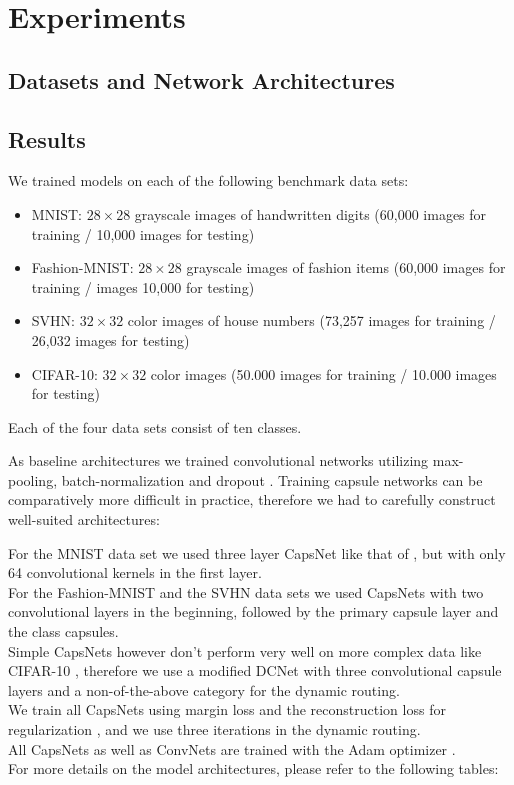 
\section{Experiments}

\subsection{Datasets and Network Architectures}



\subsection{Results}
 
 We trained models on each of the following benchmark data sets:

\begin{itemize}
	\item MNIST: $28\times28$ grayscale images of handwritten digits (60,000  images for training / 10,000  images for testing) \cite{mnist}
	\item Fashion-MNIST:  $28\times28$ grayscale images of fashion items (60,000 images for training / images 10,000 for testing) \cite{fashion}
	\item SVHN: $32\times32$ color images of house numbers (73,257  images for training / 26,032 images for testing) \cite{svhn}
	\item CIFAR-10: $32\times32$ color images (50.000  images for training / 10.000  images for testing) \cite{cifar}
\end{itemize}

Each of the four data sets consist of ten classes.

As baseline architectures we trained convolutional networks utilizing max-pooling,
batch-normalization \citep{batchnorm} and dropout \citep{dropout}.
Training capsule networks can be comparatively more difficult in practice, therefore we had to carefully construct well-suited architectures:

For the MNIST data set we used three layer CapsNet like that of \citet{capsules}, but with only 64 convolutional kernels in the first layer. \\
For the Fashion-MNIST and the SVHN data sets we used CapsNets with two convolutional layers in the beginning, followed by the primary capsule layer and the class capsules. \\
Simple CapsNets however don't perform very well on more complex data like CIFAR-10 \citep{complex}, therefore we use a modified DCNet \citep{denseanddiverse} with three convolutional capsule layers and a non-of-the-above category for the dynamic routing. \\
We train all CapsNets using margin loss and the reconstruction loss for regularization \citep{capsules}, and we use three iterations in the dynamic routing. \\
All CapsNets as well as ConvNets are trained with the Adam optimizer \citep{adam}. \\
For more details on the model architectures, please refer to the following tables: 


